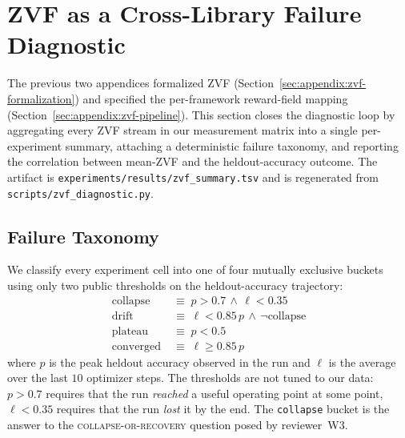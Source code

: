 %
%

\section{ZVF as a Cross-Library Failure Diagnostic}
\label{sec:zvf-cross-experiment}

The previous two appendices formalized ZVF
(Section~\ref{sec:appendix:zvf-formalization}) and specified the
per-framework reward-field mapping
(Section~\ref{sec:appendix:zvf-pipeline}). This section closes the
diagnostic loop by aggregating every ZVF stream in our measurement
matrix into a single per-experiment summary, attaching a deterministic
failure taxonomy, and reporting the correlation between mean-ZVF and
the heldout-accuracy outcome. The artifact is
\texttt{experiments/results/zvf\_summary.tsv} and is regenerated from
\texttt{scripts/zvf\_diagnostic.py}.

\subsection{Failure Taxonomy}

We classify every experiment cell into one of four mutually exclusive
buckets using only two public thresholds on the heldout-accuracy
trajectory:
\begin{align}
\mathrm{collapse} &\;\equiv\; p > 0.7 \,\wedge\, \ell < 0.35 \label{eq:collapse}\\
\mathrm{drift} &\;\equiv\; \ell < 0.85\,p \,\wedge\, \neg\mathrm{collapse} \label{eq:drift}\\
\mathrm{plateau} &\;\equiv\; p < 0.5 \label{eq:plateau}\\
\mathrm{converged} &\;\equiv\; \ell \geq 0.85\,p \label{eq:converged}
\end{align}
where $p$ is the peak heldout accuracy observed in the run and
$\ell$ is the average over the last $10$ optimizer steps. The
thresholds are not tuned to our data: $p > 0.7$ requires that the run
\emph{reached} a useful operating point at some point, $\ell < 0.35$
requires that the run \emph{lost} it by the end. The
\texttt{collapse} bucket is the answer to the
\textsc{collapse-or-recovery} question posed by reviewer~W3.

